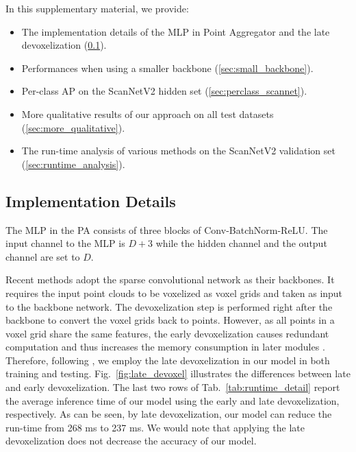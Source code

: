 \documentclass[10pt,twocolumn,letterpaper]{article}
\begin{document}
In this supplementary material, we provide:
\begin{itemize}
    \setlength\itemsep{0em}
    \item The implementation details of the MLP in Point Aggregator and the late devoxelization (\cref{sec:implementation_detail}).
    \item Performances when using a smaller backbone (\cref{sec:small_backbone}).
    \item Per-class AP on the ScanNetV2 hidden set (\cref{sec:perclass_scannet}). 
    \item More qualitative results of our approach on  all test datasets (\cref{sec:more_qualitative}).
    \item The run-time analysis of various methods on the ScanNetV2 validation set (\cref{sec:runtime_analysis}).
\end{itemize}

\subsection{Implementation Details}


\label{sec:implementation_detail}

\label{sec:mlp_lal}
The MLP in the PA consists of three blocks of Conv-BatchNorm-ReLU. The input channel to the MLP is $D+3$ while the hidden channel and the output channel are set to $D$.

\label{sec:late_devoxel}
Recent methods \cite{chen2021hierarchical,vu2022softgroup,wu2022dknet} adopt the sparse convolutional network \cite{graham20183d} as their backbones. It requires the input point clouds to be voxelized as voxel grids and taken as input to the backbone network. The devoxelization step is performed right after the backbone to convert the voxel grids back to points. However, as all points in a voxel grid share the same features, the early devoxelization causes redundant computation and thus increases the memory consumption in later modules \cite{vu2022softgroup++}. Therefore, following \cite{vu2022softgroup++}, we employ the late devoxelization in our model in both training and testing. Fig.~\ref{fig:late_devoxel} illustrates the differences between late and early devoxelization.
The last two rows of Tab.~\ref{tab:runtime_detail} report the average inference time of our model using the early and late devoxelization, respectively. As can be seen, by late devoxelization, our model can reduce the run-time from 268 ms to 237 ms. We would note that applying the late devoxelization does not decrease the accuracy of our model. 
\end{document}
